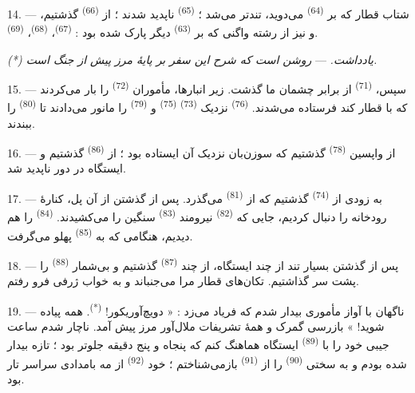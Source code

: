 \VUsaut{3.0mm}
\VUsaut{3.0mm}

14. --- شتاب قطار که بر  \textsuperscript{(64)}
می‌دوید، تندتر می‌شد ؛  \textsuperscript{(65)} ناپدید
شدند ؛ از  \textsuperscript{(66)} گذشتیم، و نیز از
رشته واگنی که بر  \textsuperscript{(63)} دیگر پارک شده بود :
 \textsuperscript{(67)}، 
\textsuperscript{(68)}،  \textsuperscript{(69)}.

\textit{(*) یادداشت.} --- \textit{روشن است که شرح این سفر بر پایهٔ مرز
پیش از جنگ است.}

15. --- سپس،  \textsuperscript{(71)} از برابر
چشمان ما گذشت. زیر انبارها، مأموران 
\textsuperscript{(72)} را بار می‌کردند که با قطار کند فرستاده می‌شدند.
 \textsuperscript{(76)} نزدیک 
\textsuperscript{(73)}  \textsuperscript{(75)} و
 \textsuperscript{(79)} را مانور می‌دادند تا
 \textsuperscript{(80)} را ببندند.

16. --- از واپسین  \textsuperscript{(78)} گذشتیم که
سوزن‌بان نزدیک آن ایستاده بود ؛ از 
\textsuperscript{(86)} گذشتیم و ایستگاه در دور ناپدید شد.

17. --- به زودی از  \textsuperscript{(74)} گذشتیم که
از  \textsuperscript{(81)} می‌گذرد. پس از گذشتن از آن پل،
کنارهٔ رودخانه را دنبال کردیم، جایی که 
\textsuperscript{(82)} نیرومند 
\textsuperscript{(83)} سنگین را می‌کشیدند. 
\textsuperscript{(84)} را هم دیدیم، هنگامی که به  \textsuperscript{(85)} پهلو می‌گرفت.

18. --- پس از گذشتن بسیار تند از چند ایستگاه، از چند 
\textsuperscript{(87)} گذشتیم و  بی‌شمار
\textsuperscript{(88)}  را پشت سر گذاشتیم.
تکان‌های قطار مرا می‌جنباند و به خواب ژرفی فرو رفتم.

\VUsaut{3.0mm}
\VUsaut{3.0mm}

19. --- ناگهان با آواز مأموری بیدار شدم که فریاد می‌زد :
« دویچ‌آوریکور! \textsuperscript{(*)}. همه پیاده شوید! » بازرسی گمرک و
همهٔ تشریفات ملال‌آور مرز پیش آمد. ناچار شدم ساعت جیبی خود را با
 \textsuperscript{(89)} ایستگاه هماهنگ کنم که پنجاه
و پنج دقیقه جلوتر بود ؛ تازه بیدار شده بودم و به سختی  \textsuperscript{(90)} را از 
\textsuperscript{(91)} بازمی‌شناختم ؛ خود 
\textsuperscript{(92)} از مه بامدادی سراسر تار بود.

